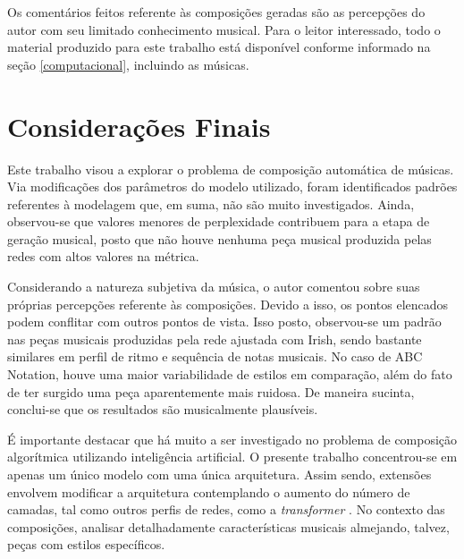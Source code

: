 \documentclass{automatextcc}
\newcommand{\nico}[1]{\textcolor{teal}{#1}}
\newcommand{\pumi}[1]{\textcolor{red}{#1}}
\begin{document}
Os comentários feitos referente às composições geradas são as percepções do autor com seu limitado conhecimento musical. Para o leitor interessado, todo o material produzido para este trabalho está disponível conforme informado na seção \ref{computacional}, incluindo as músicas.




\chapter{Considerações Finais}


Este trabalho visou a explorar o problema de composição automática de músicas. Via modificações dos parâmetros do modelo utilizado, foram identificados padrões referentes à modelagem que, em suma, não são muito investigados. Ainda, observou-se que valores menores de perplexidade contribuem para a etapa de geração musical, posto que não houve nenhuma peça musical produzida pelas redes com altos valores na métrica.

Considerando a natureza subjetiva da música, o autor comentou sobre suas próprias percepções referente às composições. Devido a isso, os pontos elencados podem conflitar com outros pontos de vista. Isso posto, observou-se um padrão nas peças musicais produzidas pela rede ajustada com Irish, sendo bastante similares em perfil de ritmo e sequência de notas musicais. No caso de ABC Notation, houve uma maior variabilidade de estilos em comparação, além do fato de ter surgido uma peça aparentemente mais ruidosa. De maneira sucinta, conclui-se que os resultados são musicalmente plausíveis.

É importante destacar que há muito a ser investigado no problema de composição algorítmica utilizando inteligência artificial. O presente trabalho concentrou-se em apenas um único modelo com uma única arquitetura. Assim sendo, extensões envolvem modificar a arquitetura contemplando o aumento do número de camadas, tal como outros perfis de redes, como a \textit{transformer} \citep{vaswani2017}. No contexto das composições, analisar detalhadamente características musicais almejando, talvez, peças com estilos específicos.







\end{document}
